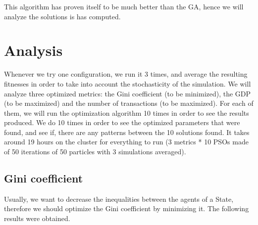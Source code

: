     This algorithm has proven itself to be much better than the GA, hence we will analyze the solutions is has computed. 

\section{Analysis}
    Whenever we try one configuration, we run it 3 times, and average the resulting fitnesses in order to take into account the stochasticity of the simulation. We will analyze three optimized metrics: the Gini coefficient (to be minimized), the GDP (to be maximized) and the number of transactions (to be maximized). For each of them, we will run the optimization algorithm 10 times in order to see the results produced. We do 10 times in order to see the optimized parameters that were found, and see if, there are any patterns between the 10 solutions found. It takes around 19 hours on the cluster for everything to run (3 metrics * 10 PSOs made of 50 iterations of 50 particles with 3 simulations averaged).

    \subsection{Gini coefficient}

        Usually, we want to decrease the inequalities between the agents of a State, therefore we should optimize the Gini coefficient by minimizing it. The following results were obtained.
    
